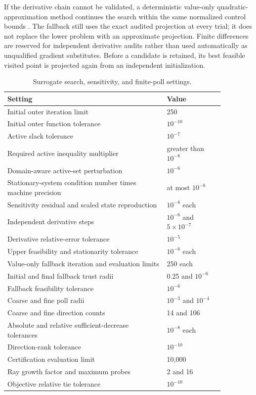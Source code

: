 If the derivative chain cannot be validated, a deterministic value-only quadratic-approximation method continues the search within the same normalized control bounds \citep{Ragonneau2022}. The fallback still uses the exact audited projection at every trial; it does not replace the lower problem with an approximate projection. Finite differences are reserved for independent derivative audits rather than used automatically as unqualified gradient substitutes. Before a candidate is retained, its best feasible visited point is projected again from an independent initialization.

\begin{table}[htbp]
\centering\small
\caption{Surrogate search, sensitivity, and finite-poll settings.}\label{tab:plant_surrogate_search_settings}
\begin{tabular}{p{0.64\linewidth}p{0.23\linewidth}}
\toprule Setting & Value\\\midrule
Initial outer iteration limit & 250\\
Initial outer function tolerance & $10^{-10}$\\
Active slack tolerance & $10^{-7}$\\
Required active inequality multiplier & greater than $10^{-8}$\\
Domain-aware active-set perturbation & $10^{-6}$\\
Stationary-system condition number times machine precision & at most $10^{-8}$\\
Sensitivity residual and scaled state reproduction & $10^{-8}$ each\\
Independent derivative steps & $10^{-6}$ and $5\times10^{-7}$\\
Derivative relative-error tolerance & $10^{-5}$\\
Upper feasibility and stationarity tolerance & $10^{-6}$ each\\
Value-only fallback iteration and evaluation limits & 250 each\\
Initial and final fallback trust radii & 0.25 and $10^{-6}$\\
Fallback feasibility tolerance & $10^{-6}$\\
Coarse and fine poll radii & $10^{-3}$ and $10^{-4}$\\
Coarse and fine direction counts & 14 and 106\\
Absolute and relative sufficient-decrease tolerances & $10^{-8}$ each\\
Direction-rank tolerance & $10^{-10}$\\
Certification evaluation limit & 10{,}000\\
Ray growth factor and maximum probes & 2 and 16\\
Objective relative tie tolerance & $10^{-10}$\\
\bottomrule
\end{tabular}
\end{table}

